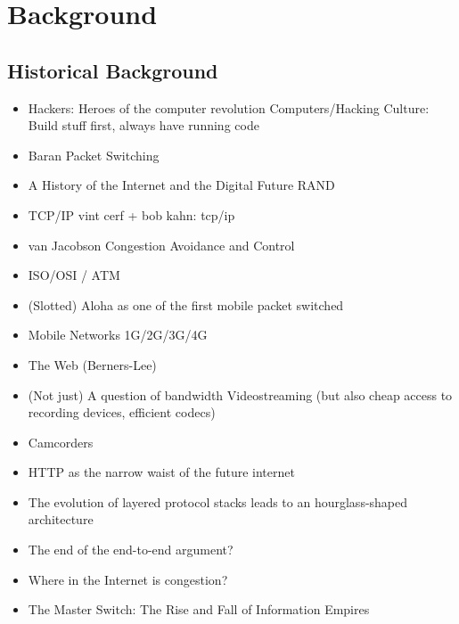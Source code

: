 \chapter{Background}
\label{chap:relatedwork}



\section{Historical Background}

\begin{itemize}
\item Hackers: Heroes of the computer revolution \cite{levy2010hackers}
		Computers/Hacking Culture: Build stuff first, always have running code
\item Baran Packet Switching
\item A History of the Internet and the Digital Future \cite{ryan2010history}
		RAND
\item TCP/IP vint cerf + bob kahn: tcp/ip \cite{1092259}
\item van Jacobson Congestion Avoidance and Control \cite{jacobson1988congestion}
\item ISO/OSI / ATM
\item (Slotted) Aloha as one of the first mobile packet switched
\item Mobile Networks 1G/2G/3G/4G
\item The Web (Berners-Lee)
\item (Not just) A question of bandwidth Videostreaming (but also cheap access to recording devices, efficient codecs)
\item Camcorders

\item HTTP as the narrow waist of the future internet \cite{Popa:2010:HNW:1868447.1868453}
\item The evolution of layered protocol stacks leads to an hourglass-shaped architecture \cite{akhshabi2011evolution}
\item The end of the end-to-end argument? \cite{reed2000end}
\item Where in the Internet is congestion? \cite{genin2013internet}
\item The Master Switch: The Rise and Fall of Information Empires \cite{wu2010master}


\end{itemize}
